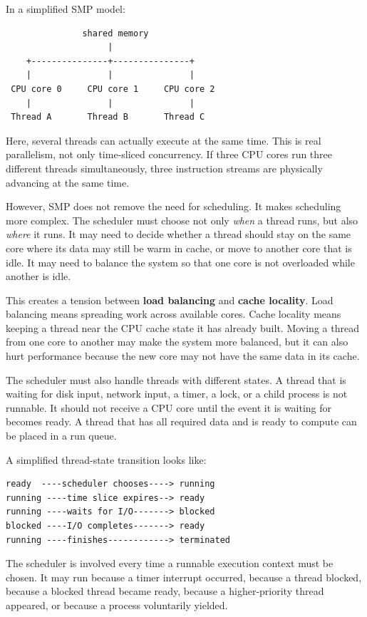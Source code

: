 In a simplified SMP model:

\begin{verbatim}
               shared memory
                    |
    +---------------+---------------+
    |               |               |
 CPU core 0     CPU core 1     CPU core 2
    |               |               |
 Thread A       Thread B       Thread C
\end{verbatim}

Here, several threads can actually execute at the same time. This is real parallelism, not only time-sliced concurrency. If three CPU cores run three different threads simultaneously, three instruction streams are physically advancing at the same time.

However, SMP does not remove the need for scheduling. It makes scheduling more complex. The scheduler must choose not only \emph{when} a thread runs, but also \emph{where} it runs. It may need to decide whether a thread should stay on the same core where its data may still be warm in cache, or move to another core that is idle. It may need to balance the system so that one core is not overloaded while another is idle.

This creates a tension between \textbf{load balancing} and \textbf{cache locality}. Load balancing means spreading work across available cores. Cache locality means keeping a thread near the CPU cache state it has already built. Moving a thread from one core to another may make the system more balanced, but it can also hurt performance because the new core may not have the same data in its cache.

The scheduler must also handle threads with different states. A thread that is waiting for disk input, network input, a timer, a lock, or a child process is not runnable. It should not receive a CPU core until the event it is waiting for becomes ready. A thread that has all required data and is ready to compute can be placed in a run queue.

A simplified thread-state transition looks like:

\begin{verbatim}
ready  ----scheduler chooses----> running
running ----time slice expires--> ready
running ----waits for I/O-------> blocked
blocked ----I/O completes-------> ready
running ----finishes------------> terminated
\end{verbatim}

The scheduler is involved every time a runnable execution context must be chosen. It may run because a timer interrupt occurred, because a thread blocked, because a blocked thread became ready, because a higher-priority thread appeared, or because a process voluntarily yielded.

